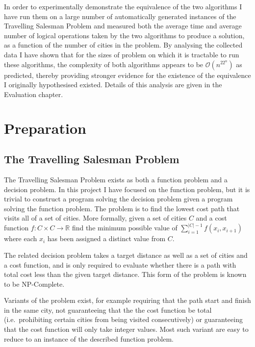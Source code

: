 \documentclass[12pt,a4paper,twoside,openright]{report}
\begin{document}
In order to experimentally demonstrate the equivalence of the two algorithms I have run them on a large number of automatically generated instances of the Travelling Salesman Problem and measured both the average time and average number of logical operations taken by the two algorithms to produce a solution, as a function of the number of cities in the problem. By analysing the collected data I have shown that for the sizes of problem on which it is tractable to run these algorithms, the complexity of both algorithms appears to be $\mathcal{O}(n^22^n)$ as predicted, thereby providing stronger evidence for the existence of the equivalence I originally hypothesised existed. Details of this analysis are given in the Evaluation chapter.

\chapter{Preparation}

\section{The Travelling Salesman Problem}
The Travelling Salesman Problem exists as both a function problem and a decision problem. In this project I have focused on the function problem, but it is trivial to construct a program solving the decision problem given a program solving the function problem. The problem is to find the lowest cost path that visits all of a set of cities. More formally, given a set of cities $C$ and a cost function $f: C\times C\to\mathbb{R}$ find the minimum possible value of $\sum_{i=1}^{|C|-1}f(x_i,x_{i+1})$ where each $x_i$ has been assigned a distinct value from $C$.

The related decision problem takes a target distance as well as a set of cities and a cost function, and is only required to evaluate whether there is a path with total cost less than the given target distance. This form of the problem is known to be NP-Complete\cite{garyComplexity}.

Variants of the problem exist, for example requiring that the path start and finish in the same city, not guaranteeing that the the cost function be total (i.e.\ prohibiting certain cities from being visited consecutively) or guaranteeing that the cost function will only take integer values. Most such variant are easy to reduce to an instance of the described function problem.
\end{document}

